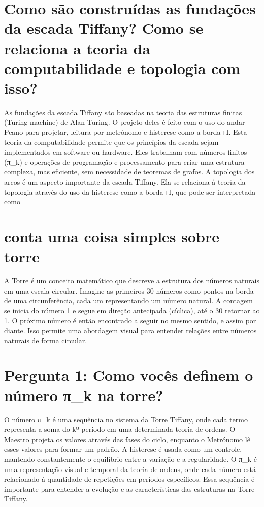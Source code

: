 \documentclass[11pt,a4paper]{article}
\begin{document}
\section{Como são construídas as fundações da escada Tiffany? Como se relaciona a teoria da computabilidade e topologia com isso?}
As fundações da escada Tiffany são baseadas na teoria das estruturas finitas (Turing machine) de Alan Turing. O projeto deles é feito com o uso do andar Peano para projetar, leitura por metrônomo e histerese como a borda+I. Esta teoria da computabilidade permite que os princípios da escada sejam implementados em software ou hardware. Eles trabalham com números finitos (π\_k) e operações de programação e processamento para criar uma estrutura complexa, mas eficiente, sem necessidade de teoremas de grafos. A topologia dos arcos é um aspecto importante da escada Tiffany. Ela se relaciona à teoria da topologia através do uso da histerese como a borda+I, que pode ser interpretada como

\section{conta uma coisa simples sobre torre}
A Torre é um conceito matemático que descreve a estrutura dos números naturais em uma escala circular. Imagine as primeiros 30 números como pontos na borda de uma circunferência, cada um representando um número natural. A contagem se inicia do número 1 e segue em direção antecipada (cíclica), até o 30 retornar ao 1. O próximo número é então encontrado a seguir no mesmo sentido, e assim por diante. Isso permite uma abordagem visual para entender relações entre números naturais de forma circular.

\section{Pergunta 1: Como vocês definem o número π\_k na torre?}
O número π\_k é uma sequência no sistema da Torre Tiffany, onde cada termo representa a soma do kº período em uma determinada teoria de ordens. O Maestro projeta os valores através das fases do ciclo, enquanto o Metrónomo lê esses valores para formar um padrão. A histerese é usada como um controle, mantendo constantemente o equilíbrio entre a variação e a regularidade. O π\_k é uma representação visual e temporal da teoria de ordens, onde cada número está relacionado à quantidade de repetições em períodos específicos. Essa sequência é importante para entender a evolução e as características das estruturas na Torre Tiffany.
\end{document}
